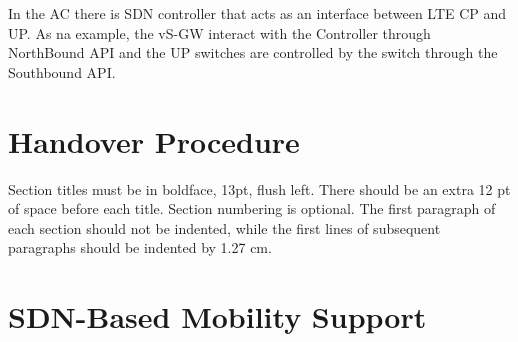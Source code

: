 \documentclass[12pt]{article}
\begin{document}
In the AC there is SDN controller that acts as an interface between LTE CP and UP. As na example, the vS-GW interact with the Controller through NorthBound API and the UP switches are controlled by the switch through the Southbound API.

\section{Handover Procedure}

Section titles must be in boldface, 13pt, flush left. There should be an extra
12 pt of space before each title. Section numbering is optional. The first
paragraph of each section should not be indented, while the first lines of
subsequent paragraphs should be indented by 1.27 cm.

\section{SDN-Based Mobility Support}
\end{document}
